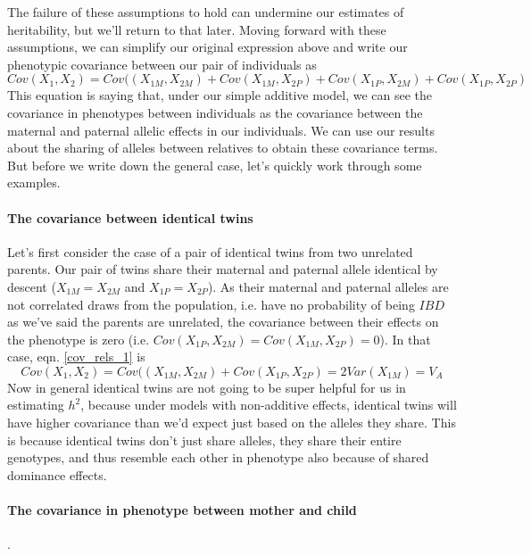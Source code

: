 The failure of these assumptions
to hold can undermine our estimates of heritability, but we'll
return to that later. Moving forward with these assumptions, we can
simplify our original expression above and write our phenotypic covariance between our pair of individuals as
\begin{equation}
Cov(X_1,X_2) =
Cov((X_{1M},X_{2M})+Cov(X_{1M},X_{2P})+Cov(X_{1P},X_{2M})
+Cov(X_{1P},X_{2P}) \label{cov_rels_1}
\end{equation}
This equation is saying that, under our simple additive model, we can see the
covariance in phenotypes between individuals as the covariance between
the maternal and paternal allelic effects in our individuals. We can use our results about
the sharing of alleles between relatives to obtain these covariance terms.
But before we write down the general case, let's quickly work through some
examples. \\

\paragraph{The covariance between identical twins}
Let's first consider the case of a pair of identical twins from two
unrelated parents. Our pair of twins share their maternal and paternal
allele identical by descent ($X_{1M}=X_{2M}$ and $X_{1P}=X_{2P}$). As their maternal and
paternal alleles are not correlated draws from the population,
i.e. have no probability of being $IBD$ as we've said the parents are unrelated, the
covariance between their effects on the phenotype is zero  
(i.e. $Cov(X_{1P},X_{2M})=Cov(X_{1M},X_{2P})=0$). In that case,
eqn. \ref{cov_rels_1} is
\begin{equation}
Cov(X_1,X_2) = Cov((X_{1M},X_{2M})+Cov(X_{1P},X_{2P}) = 2Var(X_{1M})
= V_A
\end{equation}
Now in general identical twins are not going to be super helpful for
us in estimating $h^2$, because under models with non-additive effects, identical twins will have higher covariance than we'd expect just based on the alleles they share. This is because identical twins don't just share alleles, they share their entire genotypes, and thus 
resemble each other in phenotype also because of shared dominance effects. \\

\paragraph{The covariance in phenotype between mother and child}.


